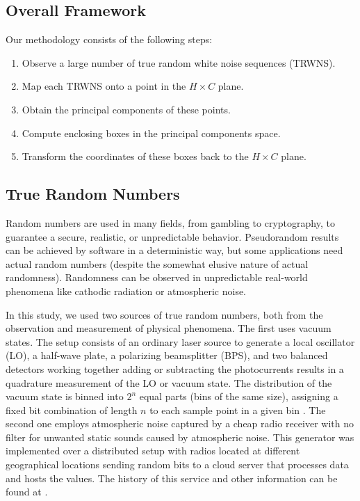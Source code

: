 \documentclass[alpha-refs]{wiley-article}
\begin{document}
\subsection{Overall Framework}\label{Sec:OverallFramework}

Our methodology consists of the following steps:
\begin{enumerate}
	\item\label{item:Methodology1} Observe a large number of true random white noise sequences (TRWNS).
	\item\label{item:Methodology2} Map each TRWNS onto a point in the $H\times C$ plane.
	\item\label{item:Methodology3} Obtain the principal components of these points.
	\item\label{item:Methodology4} Compute enclosing boxes in the principal components space.
	\item\label{item:Methodology5} Transform the coordinates of these boxes back to the $H\times C$ plane.
\end{enumerate}

\subsection{True Random Numbers}\label{Sec:TRNG}

Random numbers are used in many fields, from gambling to cryptography, to guarantee a secure, realistic, or unpredictable behavior. 
Pseudorandom results can be achieved by software in a deterministic way, but some applications need actual random numbers (despite the somewhat elusive nature of actual randomness).
Randomness can be observed in unpredictable real-world phenomena like cathodic radiation or atmospheric noise.

In this study, we used two sources of true random numbers, both from the observation and measurement of physical phenomena.
The first uses vacuum states. 
The setup consists of an ordinary laser source to generate a local oscillator (LO), a half-wave plate, a polarizing beamsplitter (BPS), and two balanced detectors working together adding or subtracting the photocurrents results in a quadrature measurement of the LO or vacuum state. 
The distribution of the vacuum state is binned into $2^n$ equal parts (bins of the same size), assigning a fixed bit combination of length $n$ to each sample point in a given bin \citep{RNGVacuumStates}. 
The second one employs atmospheric noise captured by a cheap radio receiver with no filter for unwanted static sounds caused by atmospheric noise.
This generator was implemented over a distributed setup with radios located at different geographical locations sending random bits to a cloud server that processes data and hosts the values.
The history of this service and other information can be found at \citet{RandomOrg}.
\end{document}

